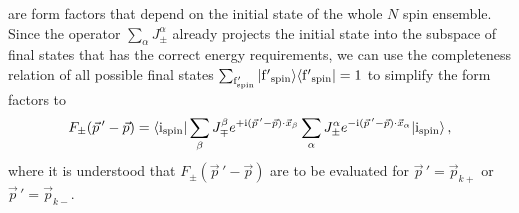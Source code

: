 \documentclass[aps,prd,10pt,twocolumn,superscriptaddress,floatfix,nofootinbib,amsmath,amssymb,altaffilletter,preprintnumbers]{revtex4-1}
\begin{document}
are form factors that depend on the initial state of the whole $N$ spin ensemble.
 Since the operator $ \sum_\alpha  J_\pm^\alpha$ already projects the initial state into the subspace of final states that has the correct energy requirements,  we can use the completeness relation of all possible final states $\sum_{\rm f'_{spin}}|{\rm f'}_{\rm spin}\rangle\langle {\rm f'}_{\rm spin}|=1$ to simplify the form factors to
\begin{equation}
 F_\pm(\vec{p}\,'-\vec{p}) = \langle {\rm i}_{\rm spin}| \sum_\beta  J_\mp^\beta e^{+{\rm i} (\vec{p}\,' - \vec{p})\cdot \vec{x}_\beta} \sum_\alpha  J_\pm^\alpha e^{-{\rm i} (\vec{p}\,' - \vec{p}) \cdot \vec{x}_\alpha}|{\rm i}_{\rm spin}\rangle \,,
\label{eq:formfactorsAA}
\end{equation}
where it is understood that $F_\pm(\vec{p}\,'-\vec{p})$ are to be evaluated for $\vec{p}\,'=\vec{p}_{k+}$ or $\vec{p}\,'=\vec{p}_{k-}$.
\end{document}
